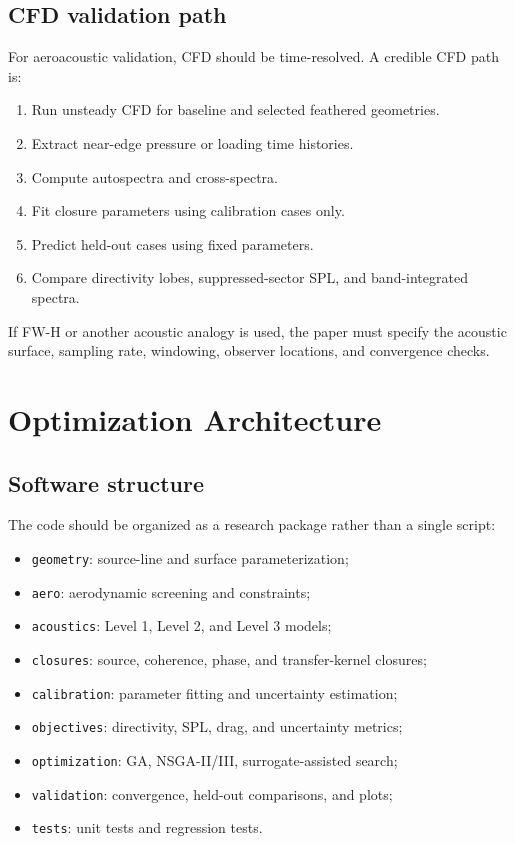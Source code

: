 \documentclass[11pt]{article}
\begin{document}
\subsection{CFD validation path}

For aeroacoustic validation, CFD should be time-resolved. A credible CFD path is:

\begin{enumerate}
    \item Run unsteady CFD for baseline and selected feathered geometries.
    \item Extract near-edge pressure or loading time histories.
    \item Compute autospectra and cross-spectra.
    \item Fit closure parameters using calibration cases only.
    \item Predict held-out cases using fixed parameters.
    \item Compare directivity lobes, suppressed-sector SPL, and band-integrated spectra.
\end{enumerate}

If FW-H or another acoustic analogy is used, the paper must specify the acoustic surface, sampling rate, windowing, observer locations, and convergence checks.

\section{Optimization Architecture}

\subsection{Software structure}

The code should be organized as a research package rather than a single script:

\begin{itemize}
    \item \texttt{geometry}: source-line and surface parameterization;
    \item \texttt{aero}: aerodynamic screening and constraints;
    \item \texttt{acoustics}: Level 1, Level 2, and Level 3 models;
    \item \texttt{closures}: source, coherence, phase, and transfer-kernel closures;
    \item \texttt{calibration}: parameter fitting and uncertainty estimation;
    \item \texttt{objectives}: directivity, SPL, drag, and uncertainty metrics;
    \item \texttt{optimization}: GA, NSGA-II/III, surrogate-assisted search;
    \item \texttt{validation}: convergence, held-out comparisons, and plots;
    \item \texttt{tests}: unit tests and regression tests.
\end{itemize}
\end{document}
